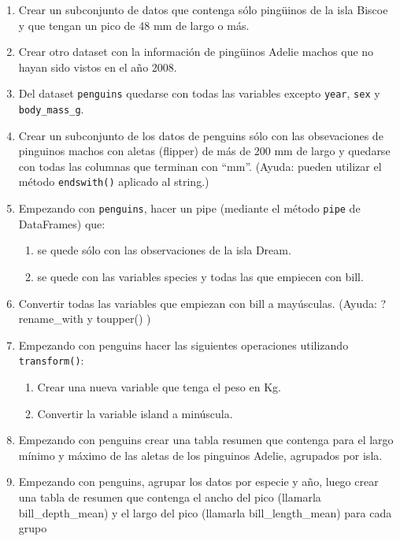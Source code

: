\documentclass[a4paper,11pt]{article}
\theoremstyle{definition}
\begin{document}
\begin{enumerate}

\item Crear un subconjunto de datos que contenga sólo ping\"uinos de la isla Biscoe y que tengan un pico de 48 mm de largo o más.
\item Crear otro dataset con la información de ping\"uinos Adelie machos que no hayan sido vistos en el año 2008.
\item Del dataset \lstinline{penguins} quedarse con todas las variables excepto \lstinline{year}, \lstinline{sex} y \lstinline{body_mass_g}.
\item Crear un subconjunto de los datos de penguins sólo con las obsevaciones de pinguinos machos con aletas (flipper) de más de 200 mm de largo y quedarse con todas las columnas que terminan con “mm”. (Ayuda: pueden utilizar el método \lstinline{endswith()} aplicado al string.)
    
    
\item Empezando con \lstinline{penguins}, hacer un pipe (mediante el método \lstinline{pipe} de DataFrames) que:
\begin{enumerate}
\item se quede sólo con las observaciones de la isla Dream.
\item se quede con las variables species y todas las que empiecen con bill.
\end{enumerate}

\item Convertir todas las variables que empiezan con bill a mayúsculas. (Ayuda: ?rename_with y toupper() )

\item Empezando con penguins hacer las siguientes operaciones utilizando \lstinline{transform()}:
\begin{enumerate}
\item Crear una nueva variable que tenga el peso en Kg.
\item Convertir la variable island a minúscula.
\end{enumerate}

\item Empezando con penguins crear una tabla resumen que contenga para el largo mínimo y máximo de las aletas de los pinguinos Adelie, agrupados por isla.

\item Empezando con penguins, agrupar los datos por especie y año, luego crear una tabla de resumen que contenga el ancho del pico (llamarla bill_depth_mean) y el largo del pico (llamarla bill_length_mean) para cada grupo


\end{enumerate}
\end{document}
